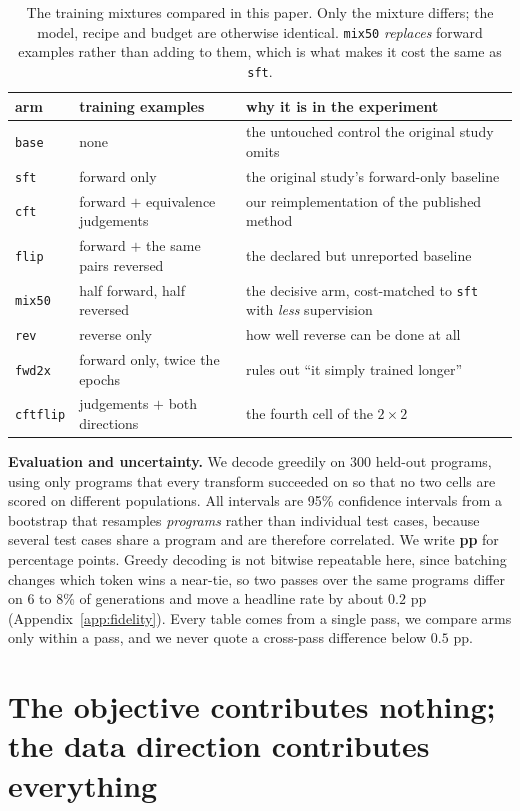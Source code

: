 \documentclass{article}
\newcommand{\arm}[1]{\texttt{#1}}
\begin{document}
\begin{table}[t]
\centering\small
\caption{The training mixtures compared in this paper. Only the mixture differs; the model,
recipe and budget are otherwise identical. \arm{mix50} \emph{replaces} forward examples
rather than adding to them, which is what makes it cost the same as \arm{sft}.}
\label{tab:arms}
\begin{tabular}{llp{6.6cm}}
\toprule
arm & training examples & why it is in the experiment \\
\midrule
\arm{base} & none & the untouched control the original study omits \\
\arm{sft} & forward only & the original study's forward-only baseline \\
\arm{cft} & forward $+$ equivalence judgements & our reimplementation of the published method \\
\arm{flip} & forward $+$ the same pairs reversed & the declared but unreported baseline \\
\arm{mix50} & half forward, half reversed & the decisive arm, cost-matched to \arm{sft} with \emph{less} supervision \\
\arm{rev} & reverse only & how well reverse can be done at all \\
\arm{fwd2x} & forward only, twice the epochs & rules out ``it simply trained longer'' \\
\arm{cftflip} & judgements $+$ both directions & the fourth cell of the $2\times2$ \\
\bottomrule
\end{tabular}
\end{table}

\textbf{Evaluation and uncertainty.} We decode greedily on 300 held-out programs, using
only programs that every transform succeeded on so that no two cells are scored on
different populations. All intervals are 95\% confidence intervals from a bootstrap that
resamples \emph{programs} rather than individual test cases, because several test cases
share a program and are therefore correlated. We write \textbf{pp} for percentage points.
Greedy decoding is not bitwise repeatable here, since batching changes which token wins a
near-tie, so two passes over the same programs differ on 6 to 8\% of generations and move a
headline rate by about $0.2$ pp (Appendix~\ref{app:fidelity}). Every table comes from a single
pass, we compare arms only within a pass, and we never quote a cross-pass difference below
$0.5$ pp.

\section{The objective contributes nothing; the data direction contributes everything}
\label{sec:factorial}
\end{document}
